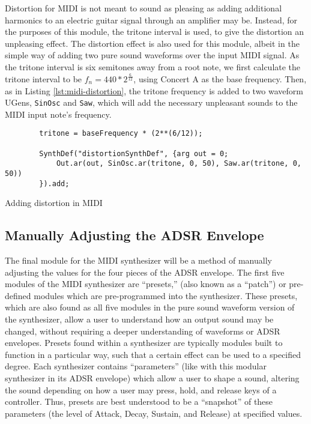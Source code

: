 Distortion for MIDI is not meant to sound as pleasing as adding additional harmonics to an electric guitar signal through an amplifier may be. Instead, for the purposes of this module, the tritone interval is used, to give the distortion an unpleasing effect. The distortion effect is also used for this module, albeit in the simple way of adding two pure sound waveforms over the input MIDI signal. As the tritone interval is six semitones away from a root note, we first calculate the tritone interval to be $f_n = 440 * 2^\frac{6}{12}$, using Concert A as the base frequency. Then, as in Listing \ref{lst:midi-distortion}, the tritone frequency is added to two waveform UGens, \texttt{SinOsc} and \texttt{Saw}, which will add the necessary unpleasant sounds to the MIDI input note's frequency.

\begin{listing}
	\begin{lstlisting}
		tritone = baseFrequency * (2**(6/12));
			
		SynthDef("distortionSynthDef", {arg out = 0;
			Out.ar(out, SinOsc.ar(tritone, 0, 50), Saw.ar(tritone, 0, 50))
		}).add;
	\end{lstlisting}
	\caption{Adding distortion in MIDI}
	\label{lst:midi-distortion}
\end{listing}


\subsection{Manually Adjusting the ADSR Envelope}

The final module for the MIDI synthesizer will be a method of manually adjusting the values for the four pieces of the ADSR envelope. The first five modules of the MIDI synthesizer are ``presets,'' (also known as a ``patch'') or pre-defined modules which are pre-programmed into the synthesizer. These presets, which are also found as all five modules in the pure sound waveform version of the synthesizer, allow a user to understand how an output sound may be changed, without requiring a deeper understanding of waveforms or ADSR envelopes. Presets found within a synthesizer are typically modules built to function in a particular way, such that a certain effect can be used to a specified degree. Each synthesizer contains ``parameters'' (like with this modular synthesizer in its ADSR envelope) which allow a user to shape a sound, altering the sound depending on how a user may press, hold, and release keys of a controller. Thus, presets are best understood to be a ``snapshot'' of these parameters (the level of Attack, Decay, Sustain, and Release) at specified values.

